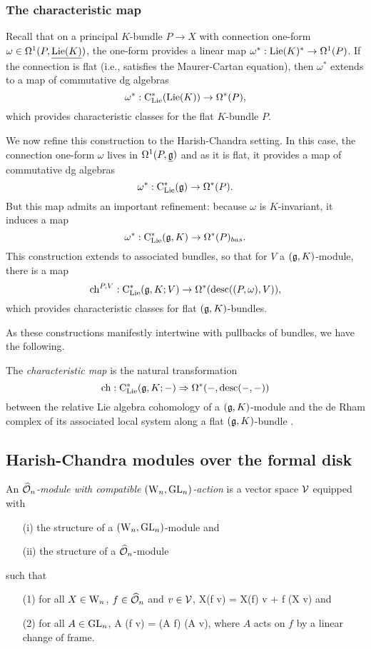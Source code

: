 \documentclass[10pt]{amsart}
\begin{document}
\subsubsection{The characteristic map}

Recall that on a principal $K$-bundle $P \to X$ with connection one-form $\omega \in \Omega^1(P,\underline{{\rm Lie}(K)})$, 
the one-form provides a linear map $\omega^*: {\rm Lie}(K)^* \to \Omega^1(P)$.
If the connection is flat (i.e., satisfies the Maurer-Cartan equation), 
then $\omega^*$ extends to a map of commutative dg algebras
\[
\omega^*: {\rm C}_{{\rm Lie}}^*({\rm Lie}(K)) \to \Omega^*(P),
\]
which provides characteristic classes for the flat $K$-bundle $P$.

We now refine this construction to the Harish-Chandra setting.
In this case, the connection one-form $\omega$ lives in $\Omega^1(P, \underline{\mathfrak g})$ and as it is flat,
it provides a map of commutative dg algebras
\[
\omega^*: {\rm C}_{{\rm Lie}}^*(\mathfrak g) \to \Omega^*(P).
\]
But this map admits an important refinement: 
because $\omega$ is $K$-invariant, it induces a map
\[
\omega^*: {\rm C}_{{\rm Lie}}^*(\mathfrak g,K) \to \Omega^*(P)_{bas}.
\]
This construction extends to associated bundles, so that for $V$ a $(\mathfrak g,K)$-module, there is a map
\[
{\rm ch}^{P,V} : {\rm C}_{{\rm Lie}}^*(\mathfrak g, K; V) \to \Omega^*({\rm desc}((P,\omega),V)), 
\]
which provides characteristic classes for flat $(\mathfrak g,K)$-bundles.

As these constructions manifestly intertwine with pullbacks of bundles, we have the following.

\begin{dfn}
The {\em characteristic map} is the natural transformation
\[
{\rm ch}: {\rm C}_{{\rm Lie}}^*(\mathfrak g,K; -) \Rightarrow \Omega^*(-, {\rm desc}(-,-))
\]
between the relative Lie algebra cohomology of a $(\mathfrak g,K)$-module and 
the de Rham complex of its associated local system along a flat $(\mathfrak g,K)$-bundle .
\end{dfn}

\subsection{Harish-Chandra modules over the formal disk}

\begin{dfn} 
An {\em $\widehat{\mathcal O}_n$-module with compatible $({{\rm W}_n}, {\rm GL}_n)$-action} is a
  vector space $\mathcal{V}$ equipped with
\begin{itemize}
\item[(i)] the structure of a $({{\rm W}_n}, {\rm GL}_n)$-module and
\item[(ii)] the structure of a $\widehat{\mathcal O}_n$-module
\end{itemize}
such that 
\begin{itemize}
\item[(1)] for all $X \in {{\rm W}_n}$, $f \in \widehat{\mathcal O}_n$ and $v \in \mathcal{V}$,
\ben
X(f \cdot v) = X(f) \cdot v + f \cdot (X \cdot v) 
\een 
and
\item[(2)] for all $A \in {\rm GL}_n$, 
\ben
A (f \cdot v) = (A \cdot f) \cdot (A \cdot v),
\een 
where $A$ acts on $f$ by a linear change of frame.
\end{itemize}
\end{dfn}
\end{document}
